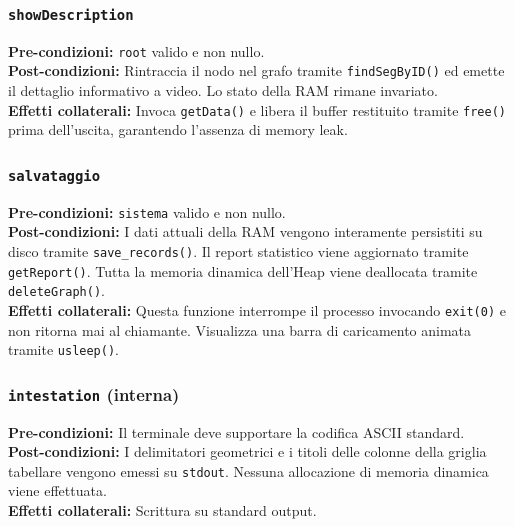 \documentclass[12pt, a4paper]{article}
\begin{document}
\subsubsection{\texttt{showDescription}}
\vspace{3mm}
\begin{specbox}
\textbf{Pre-condizioni:} \texttt{root} valido e non nullo. \\
\textbf{Post-condizioni:} Rintraccia il nodo nel grafo tramite \texttt{findSegByID()} ed emette il dettaglio informativo a video. Lo stato della RAM rimane invariato. \\
\textbf{Effetti collaterali:} Invoca \texttt{getData()} e libera il buffer restituito tramite \texttt{free()} prima dell'uscita, garantendo l'assenza di memory leak.
\end{specbox}

\subsubsection{\texttt{salvataggio}}
\vspace{3mm}
\begin{specbox}
\textbf{Pre-condizioni:} \texttt{sistema} valido e non nullo. \\
\textbf{Post-condizioni:} I dati attuali della RAM vengono interamente persistiti su disco tramite \texttt{save\_records()}. Il report statistico viene aggiornato tramite \texttt{getReport()}. Tutta la memoria dinamica dell'Heap viene deallocata tramite \texttt{deleteGraph()}. \\
\textbf{Effetti collaterali:} Questa funzione interrompe il processo invocando \texttt{exit(0)} e non ritorna mai al chiamante. Visualizza una barra di caricamento animata tramite \texttt{usleep()}.
\end{specbox}

\subsubsection{\texttt{intestation} (interna)}
\vspace{3mm}
\begin{specbox}
\textbf{Pre-condizioni:} Il terminale deve supportare la codifica ASCII standard. \\
\textbf{Post-condizioni:} I delimitatori geometrici e i titoli delle colonne della griglia tabellare vengono emessi su \texttt{stdout}. Nessuna allocazione di memoria dinamica viene effettuata. \\
\textbf{Effetti collaterali:} Scrittura su standard output.
\end{specbox}
\end{document}
